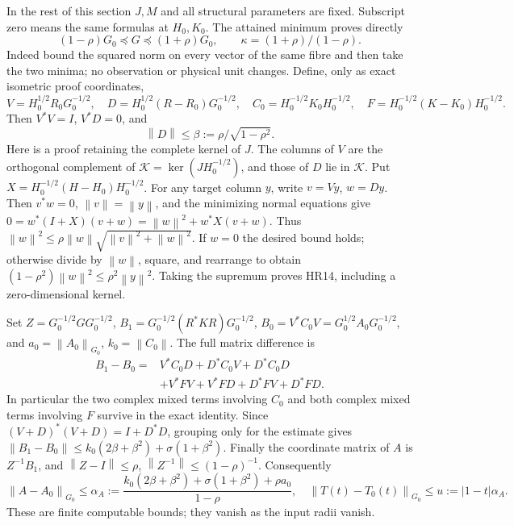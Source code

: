 \documentclass[11pt]{article}
\newcommand{\norm}[1]{\left\lVert#1\right\rVert}
\begin{document}
In the rest of this section \(J,M\) and all structural parameters
are fixed. Subscript zero means the same formulas at \(H_0,K_0\).
The attained minimum proves directly
\begin{equation}\tag{HR13}\label{HR13}
(1-\rho)G_0\preceq G\preceq(1+\rho)G_0,\qquad
\kappa=(1+\rho)/(1-\rho).
\end{equation}
Indeed bound the squared norm on every vector of the same fibre
and then take the two minima; no observation or physical unit changes.
Define, only as exact isometric proof coordinates,
\[
V=H_0^{1/2}R_0G_0^{-1/2},\quad
D=H_0^{1/2}(R-R_0)G_0^{-1/2},\quad
C_0=H_0^{-1/2}K_0H_0^{-1/2},\quad
F=H_0^{-1/2}(K-K_0)H_0^{-1/2}.
\]
Then \(V^*V=I\), \(V^*D=0\), and
\begin{equation}\tag{HR14}\label{HR14}
\norm D\le\beta:=\rho/\sqrt{1-\rho^2}.
\end{equation}
Here is a proof retaining the complete kernel of \(J\).
The columns of \(V\) are the orthogonal complement of
\(\mathcal K=\ker(JH_0^{-1/2})\), and those of \(D\) lie in \(\mathcal K\).
Put \(X=H_0^{-1/2}(H-H_0)H_0^{-1/2}\). For any target column \(y\),
write \(v=Vy\), \(w=Dy\). Then \(v^*w=0\), \(\norm v=\norm y\),
and the minimizing normal equations give
\(0=w^*(I+X)(v+w)=\norm w^2+w^*X(v+w)\).
Thus \(\norm w^2\le\rho\norm w\sqrt{\norm v^2+\norm w^2}\).
If \(w=0\) the desired bound holds; otherwise divide by \(\norm w\),
square, and rearrange to obtain
\((1-\rho^2)\norm w^2\le\rho^2\norm y^2\).
Taking the supremum proves HR14, including a zero-dimensional kernel.

Set \(Z=G_0^{-1/2}GG_0^{-1/2}\),
\(B_1=G_0^{-1/2}(R^*KR)G_0^{-1/2}\),
\(B_0=V^*C_0V=G_0^{1/2}A_0G_0^{-1/2}\), and \(a_0=\norm{A_0}_{G_0}\),
\(k_0=\norm{C_0}\). The full matrix difference is
\begin{equation}\tag{HR15}\label{HR15}
\begin{split}
B_1-B_0={}&V^*C_0D+D^*C_0V+D^*C_0D\\
&+V^*FV+V^*FD+D^*FV+D^*FD.
\end{split}
\end{equation}
In particular the two complex mixed terms involving \(C_0\) and both
complex mixed terms involving \(F\) survive in the exact identity.
Since \((V+D)^*(V+D)=I+D^*D\), grouping only for the estimate gives
\(\norm{B_1-B_0}\le k_0(2\beta+\beta^2)+\sigma(1+\beta^2)\).
Finally the coordinate matrix of \(A\) is \(Z^{-1}B_1\), and
\(\norm{Z-I}\le\rho\), \(\norm{Z^{-1}}\le(1-\rho)^{-1}\).
Consequently
\begin{equation}\tag{HR16}\label{HR16}
\norm{A-A_0}_{G_0}\le
\alpha_A:=\frac{k_0(2\beta+\beta^2)+\sigma(1+\beta^2)+\rho a_0}
{1-\rho},\quad
\norm{T(t)-T_0(t)}_{G_0}\le u:=|1-t|\alpha_A.
\end{equation}
These are finite computable bounds; they vanish as the input radii vanish.
\end{document}
